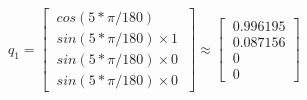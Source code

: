 \documentclass[preview]{standalone}
\begin{document}
\begin{center}
$q_1 = \begin{bmatrix}\
                    cos(5*\pi/180) \\\
                    sin(5*\pi/180) \times 1 \\\
                    sin(5*\pi/180) \times 0 \\\
                    sin(5*\pi/180) \times 0\
                \end{bmatrix} \approx \begin{bmatrix}\
                    0.996195 \\\
                    0.087156 \\\
                    0 \\\
                    0\
                \end{bmatrix}$
\end{center}
\end{document}
